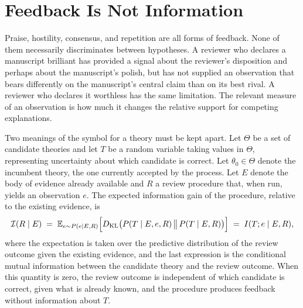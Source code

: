 \documentclass[11pt]{article}
\theoremstyle{remark}
\newcommand{\E}{\mathbb{E}}
\newcommand{\KL}{D_{\mathrm{KL}}}
\begin{document}
\section{Feedback Is Not Information}
\label{sec:info}

Praise, hostility, consensus, and repetition are all forms of feedback. None of them necessarily discriminates between hypotheses. A reviewer who declares a manuscript brilliant has provided a signal about the reviewer's disposition and perhaps about the manuscript's polish, but has not supplied an observation that bears differently on the manuscript's central claim than on its best rival. A reviewer who declares it worthless has the same limitation. The relevant measure of an observation is how much it changes the relative support for competing explanations.

Two meanings of the symbol for a theory must be kept apart. Let $\Theta$ be a set of candidate theories and let $T$ be a random variable taking values in $\Theta$, representing uncertainty about which candidate is correct. Let $\theta_0\in\Theta$ denote the incumbent theory, the one currently accepted by the process. Let $E$ denote the body of evidence already available and $R$ a review procedure that, when run, yields an observation $e$. The expected information gain of the procedure, relative to the existing evidence, is
\begin{equation}
\mathcal I(R\mid E) \;=\; \E_{e\sim P(e\mid E,R)}\Bigl[\KL\bigl(P(T\mid E,e,R)\,\big\|\,P(T\mid E,R)\bigr)\Bigr] \;=\; I(T;e\mid E,R),
\label{eq:infogain}
\end{equation}
where the expectation is taken over the predictive distribution of the review outcome given the existing evidence, and the last expression is the conditional mutual information between the candidate theory and the review outcome. When this quantity is zero, the review outcome is independent of which candidate is correct, given what is already known, and the procedure produces feedback without information about $T$.
\end{document}
